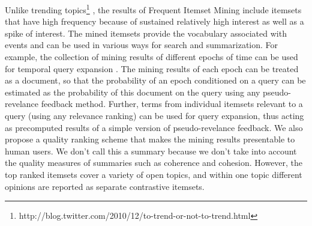\documentclass{sig-alternate}
\begin{document}
Unlike trending topics\footnote{http://blog.twitter.com/2010/12/to-trend-or-not-to-trend.html}  \cite{mathioudakis2010twittermonitor}, the results of Frequent Itemset Mining include itemsets that have high frequency because of sustained relatively high interest as well as a spike of interest. 
The mined itemsets provide the vocabulary associated with events and can be used in various ways for search and summarization. For example, the collection of mining results of different epochs of time can be used for temporal query expansion \cite{choi2012temporal}. The mining results of each epoch can be treated as a document, so that the probability of an epoch conditioned on a query can be estimated as the probability of this document on the query using any pseudo-revelance feedback method. Further, terms from individual itemsets relevant to a query (using any relevance ranking) can be used for query expansion, thus acting as precomputed results of a simple version of pseudo-revelance feedback. 
We also propose a quality ranking scheme that makes the mining results presentable to human users. We don't call this a summary because we don't take into account the quality measures of summaries such as coherence and cohesion. However, the top ranked itemsets cover a variety of open topics, and within one topic different opinions are reported as separate contrastive itemsets.  
\end{document}
